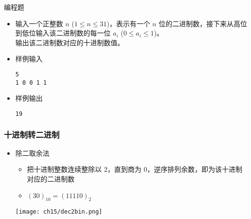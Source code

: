 \begin{frame}[fragile]
{\begin{exampleblock}{编程题}
            \begin{itemize}
                \item 输入一个正整数 $n$ ($1 \le n \le 31$)，表示有一个 $n$ 位的二进制数，接下来从高位到低位输入该二进制数的每一位 $a_i$ ($0 \le a_{i} \le 1$)。\\
                    输出该二进制数对应的十进制数值。

                \item 样例输入

                    \lstinline|5|\\
                    \lstinline|1 0 0 1 1|

                \item 样例输出

                    \lstinline|19|

            \end{itemize}

        \end{exampleblock}
    }
\end{frame}

\begin{frame}[fragile]
    \frametitle{十进制转二进制}

    \begin{itemize}
        \item 除二取余法
        \begin{itemize}
           \item 把十进制整数连续整除以 $2$，直到商为 $0$，逆序排列余数，即为该十进制对应的二进制数
           \item $(30)_{10} = (11110)_2$
        \end{itemize}
        
        \texttt{[image: ch15/dec2bin.png]}
    \end{itemize}

\end{frame}

